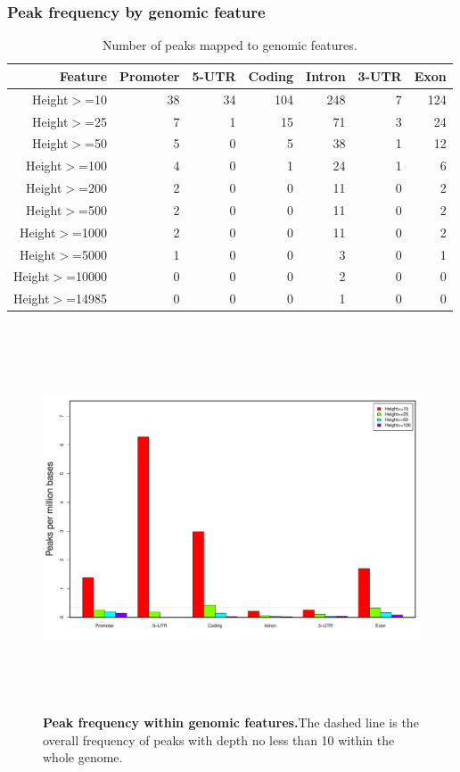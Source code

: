 \documentclass{article}
\begin{document}
\subsubsection{Peak frequency by genomic feature}
{\tiny
\begin{longtable}{|r|r|r|r|r|r|r|}
\caption{Number of peaks mapped to genomic features.} \\ 
  \hline
Feature & Promoter & 5-UTR & Coding & Intron & 3-UTR & Exon \\ 
  \hline
Height$>$=10 & 38 & 34 & 104 & 248 & 7 & 124 \\ 
   \rowcolor[gray]{0.9}Height$>$=25 &  7 &  1 &  15 &  71 & 3 &  24 \\ 
  Height$>$=50 &  5 &  0 &   5 &  38 & 1 &  12 \\ 
   \rowcolor[gray]{0.9}Height$>$=100 &  4 &  0 &   1 &  24 & 1 &   6 \\ 
  Height$>$=200 &  2 &  0 &   0 &  11 & 0 &   2 \\ 
   \rowcolor[gray]{0.9}Height$>$=500 &  2 &  0 &   0 &  11 & 0 &   2 \\ 
  Height$>$=1000 &  2 &  0 &   0 &  11 & 0 &   2 \\ 
   \rowcolor[gray]{0.9}Height$>$=5000 &  1 &  0 &   0 &   3 & 0 &   1 \\ 
  Height$>$=10000 &  0 &  0 &   0 &   2 & 0 &   0 \\ 
   \rowcolor[gray]{0.9}Height$>$=14985 &  0 &  0 &   0 &   1 & 0 &   0 \\ 
   \hline
\hline
\end{longtable}
}
\begin{center}
\begin{figure}[H]
\includegraphics[width=7in, height=4.5in, page=1]{bamchop-chip-peak-by-feature}
\caption{\textbf{Peak frequency within genomic features.}The dashed line is the overall frequency of peaks with depth no less than 10 within the whole genome.}
\end{figure}
\end{center}
\end{document}
